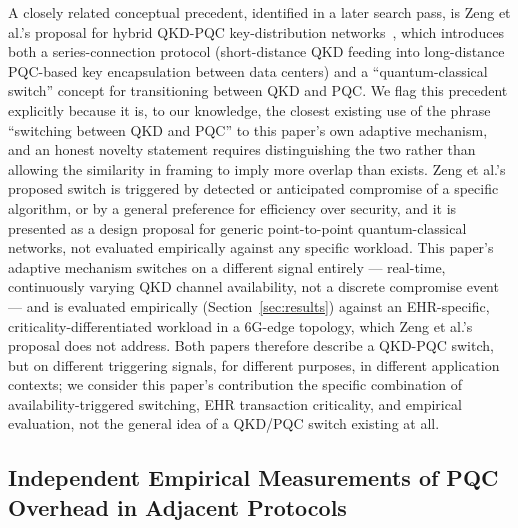\documentclass[journal]{IEEEtran}
\begin{document}
A closely related conceptual precedent, identified in a later search pass, is Zeng et al.'s proposal for hybrid QKD-PQC key-distribution networks~\cite{zeng2024hybridqkdpqc}, which introduces both a series-connection protocol (short-distance QKD feeding into long-distance PQC-based key encapsulation between data centers) and a ``quantum-classical switch'' concept for transitioning between QKD and PQC. We flag this precedent explicitly because it is, to our knowledge, the closest existing use of the phrase ``switching between QKD and PQC'' to this paper's own adaptive mechanism, and an honest novelty statement requires distinguishing the two rather than allowing the similarity in framing to imply more overlap than exists. Zeng et al.'s proposed switch is triggered by detected or anticipated compromise of a specific algorithm, or by a general preference for efficiency over security, and it is presented as a design proposal for generic point-to-point quantum-classical networks, not evaluated empirically against any specific workload. This paper's adaptive mechanism switches on a different signal entirely --- real-time, continuously varying QKD channel availability, not a discrete compromise event --- and is evaluated empirically (Section~\ref{sec:results}) against an EHR-specific, criticality-differentiated workload in a 6G-edge topology, which Zeng et al.'s proposal does not address. Both papers therefore describe a QKD-PQC switch, but on different triggering signals, for different purposes, in different application contexts; we consider this paper's contribution the specific combination of availability-triggered switching, EHR transaction criticality, and empirical evaluation, not the general idea of a QKD/PQC switch existing at all.

\subsection{Independent Empirical Measurements of PQC Overhead in Adjacent Protocols}
\label{sec:pqcoverheadlit}
\end{document}
